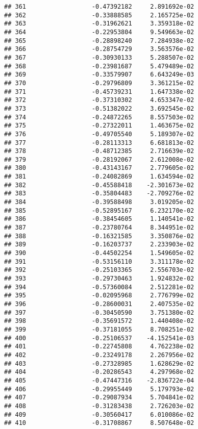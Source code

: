\documentclass[
]{article}
\begin{document}
\begin{verbatim}
## 361                  -0.47392182     2.891692e-02
## 362                  -0.33888585     2.165725e-02
## 363                  -0.31962621     3.359318e-02
## 364                  -0.22953804     9.549663e-02
## 365                  -0.28898240     7.284938e-02
## 366                  -0.28754729     3.563576e-02
## 367                  -0.30930133     5.288507e-02
## 368                  -0.23981687     5.479489e-02
## 369                  -0.33579907     6.643249e-03
## 370                  -0.29796809     3.361215e-02
## 371                  -0.45739231     1.647338e-02
## 372                  -0.37310302     4.653347e-02
## 373                  -0.51382022     3.692545e-02
## 374                  -0.24872265     8.557503e-02
## 375                  -0.27322011     1.463675e-02
## 376                  -0.49705540     5.189307e-02
## 377                  -0.28113313     6.681813e-02
## 378                  -0.48712385     2.716639e-02
## 379                  -0.28192067     2.612008e-02
## 380                  -0.43143167     2.779605e-02
## 381                  -0.24082869     1.634594e-02
## 382                  -0.45588418    -2.301673e-02
## 383                  -0.35804483    -2.709276e-02
## 384                  -0.39588498     3.019205e-02
## 385                  -0.52895167     6.232170e-02
## 386                  -0.38454605     1.140541e-02
## 387                  -0.23780764     8.344951e-02
## 388                  -0.16321585     3.350876e-02
## 389                  -0.16203737     2.233903e-02
## 390                  -0.44502254     1.549605e-02
## 391                  -0.53156110     3.311178e-02
## 392                  -0.25103365     2.556703e-02
## 393                  -0.29730463     1.924832e-02
## 394                  -0.57360084     2.512281e-02
## 395                  -0.02095968     2.776799e-02
## 396                  -0.28600031     2.407535e-02
## 397                  -0.30450590     3.751380e-02
## 398                  -0.35691572     1.440408e-02
## 399                  -0.37181055     8.708251e-02
## 400                  -0.25106537    -4.152541e-03
## 401                  -0.22745808     4.762238e-02
## 402                  -0.23249178     2.267956e-02
## 403                  -0.27328985     1.628629e-02
## 404                  -0.20286543     4.297968e-02
## 405                  -0.47447316    -2.836722e-04
## 406                  -0.29955449     5.179793e-02
## 407                  -0.29087934     5.704841e-02
## 408                  -0.31283438     2.726203e-02
## 409                  -0.30560417     6.010086e-02
## 410                  -0.31708867     8.507648e-02

\end{verbatim}
\end{document}
